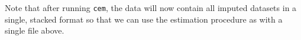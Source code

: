 \documentclass[11pt,titlepage]{article}
\newcommand{\cem}{\texttt{cem }}
\begin{document}
Note that after running \texttt{cem}, the data will now contain all imputed datasets in a single, stacked format so that we can use the estimation procedure as with a single file above. 














\end{document}
